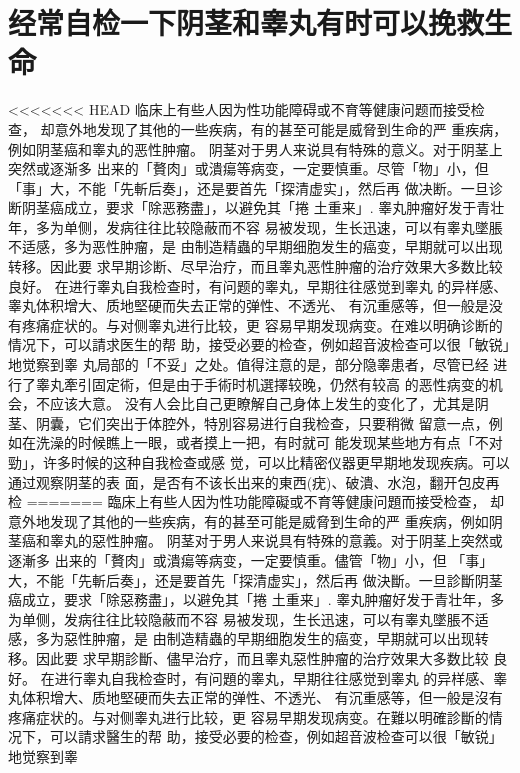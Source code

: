 \documentclass[12pt,UTF8]{ctexbook}
\begin{document}
\section{经常自检一下阴茎和睾丸有时可以挽救生命}

<<<<<<< HEAD
临床上有些人因为性功能障碍或不育等健康问题而接受检查，
却意外地发现了其他的一些疾病，有的甚至可能是威脅到生命的严
重疾病，例如阴茎癌和睾丸的恶性肿瘤。
阴茎对于男人来说具有特殊的意义。对于阴茎上突然或逐渐多
出来的「贅肉」或潰瘍等病变，一定要慎重。尽管「物」小，但
「事」大，不能「先斬后奏」，还是要首先「探清虚实」，然后再
做决断。一旦诊断阴茎癌成立，要求「除恶務盡」，以避免其「捲
土重来」.
睾丸肿瘤好发于青壮年，多为单侧，发病往往比较隐蔽而不容
易被发现，生长迅速，可以有睾丸墜脹不适感，多为恶性肿瘤，是
由制造精蟲的早期细胞发生的癌变，早期就可以出现转移。因此要
求早期诊断、尽早治疗，而且睾丸恶性肿瘤的治疗效果大多数比较
良好。
在进行睾丸自我检查时，有问题的睾丸，早期往往感觉到睾丸
的异样感、睾丸体积增大、质地堅硬而失去正常的弹性、不透光、
有沉重感等，但一般是没有疼痛症状的。与对侧睾丸进行比较，更
容易早期发现病变。在难以明确诊断的情况下，可以請求医生的帮
助，接受必要的检查，例如超音波检查可以很「敏锐」地觉察到睾
丸局部的「不妥」之处。值得注意的是，部分隐睾患者，尽管已经
进行了睾丸牽引固定術，但是由于手術时机選擇较晚，仍然有较高
的恶性病变的机会，不应该大意。
没有人会比自己更瞭解自己身体上发生的变化了，尤其是阴
茎、阴囊，它们突出于体腔外，特別容易进行自我检查，只要稍微
留意一点，例如在洗澡的时候瞧上一眼，或者摸上一把，有时就可
能发现某些地方有点「不对勁」，许多时候的这种自我检查或感
觉，可以比精密仪器更早期地发现疾病。可以通过观察阴茎的表
面，是否有不该长出来的東西(疣)、破潰、水泡，翻开包皮再检
=======
臨床上有些人因为性功能障礙或不育等健康问題而接受检查，
却意外地发现了其他的一些疾病，有的甚至可能是威脅到生命的严
重疾病，例如阴茎癌和睾丸的惡性肿瘤。
阴茎对于男人来说具有特殊的意義。对于阴茎上突然或逐漸多
出来的「贅肉」或潰瘍等病变，一定要慎重。儘管「物」小，但
「事」大，不能「先斬后奏」，还是要首先「探清虚实」，然后再
做決斷。一旦診斷阴茎癌成立，要求「除惡務盡」，以避免其「捲
土重来」.
睾丸肿瘤好发于青壮年，多为单侧，发病往往比较隐蔽而不容
易被发现，生长迅速，可以有睾丸墜脹不适感，多为惡性肿瘤，是
由制造精蟲的早期细胞发生的癌变，早期就可以出现转移。因此要
求早期診斷、儘早治疗，而且睾丸惡性肿瘤的治疗效果大多数比较
良好。
在进行睾丸自我检查时，有问題的睾丸，早期往往感觉到睾丸
的异样感、睾丸体积增大、质地堅硬而失去正常的弹性、不透光、
有沉重感等，但一般是沒有疼痛症状的。与对侧睾丸进行比较，更
容易早期发现病变。在難以明確診斷的情况下，可以請求醫生的帮
助，接受必要的检查，例如超音波检查可以很「敏锐」地觉察到睾
\end{document}
